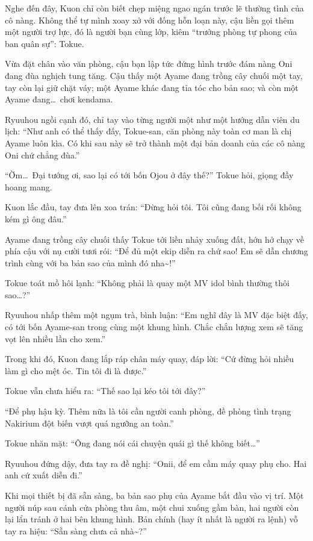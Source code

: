 \documentclass[../main.tex]{subfiles}
\begin{document}
Nghe đến đây, Kuon chỉ còn biết chẹp miệng ngao ngán trước lẽ thường tình của cô nàng. Không thể tự mình xoay xở với đống hỗn loạn này, cậu liền gọi thêm một người trợ lực, đó là người bạn cùng lớp, kiêm ``trưởng phòng tự phong của ban quân sự'': Tokue.

Vừa đặt chân vào văn phòng, cậu bạn lập tức đứng hình trước đám nàng Oni đang đùa nghịch tung tăng. Cậu thấy một Ayame đang trồng cây chuối một tay, tay còn lại giữ chặt váy; một Ayame khác đang tỉa tóc cho bản sao; và còn một Ayame đang\dots\ chơi kendama.

Ryuuhou ngồi cạnh đó, chỉ tay vào từng người một như một hướng dẫn viên du lịch: ``Như anh có thể thấy đấy, Tokue-san, căn phòng này toàn cơ man là chị Ayame luôn kìa. Có khi sau này sẽ trở thành một đại bản doanh của các cô nàng Oni chứ chẳng đùa.''

``Ờm\dots\ Đại tướng ơi, sao lại có tới bốn Ojou ở đây thế?'' Tokue hỏi, giọng đầy hoang mang.

Kuon lắc đầu, tay đưa lên xoa trán: ``Đừng hỏi tôi. Tôi cũng đang bối rối không kém gì ông đâu.''

Ayame đang trồng cây chuối thấy Tokue tới liền nhảy xuống đất, hớn hở chạy về phía cậu với nụ cười tươi rói: ``Để đủ một ekip diễn ra chứ sao! Em sẽ dẫn chương trình cùng với ba bản sao của mình đó nha\~{}!''

Tokue toát mồ hôi lạnh: ``Không phải là quay một MV idol bình thường thôi sao\dots?''

Ryuuhou nhấp thêm một ngụm trà, bình luận: ``Em nghĩ đây là MV đặc biệt đấy, có tới bốn Ayame-san trong cùng một khung hình. Chắc chắn lượng xem sẽ tăng vọt lên nhiều lần cho xem.''

Trong khi đó, Kuon đang lắp ráp chân máy quay, đáp lời: ``Cứ đừng hỏi nhiều làm gì cho mệt óc. Tin tôi đi là được.''

Tokue vẫn chưa hiểu ra: ``Thế sao lại kéo tôi tới đây?''

``Để phụ hậu kỳ. Thêm nữa là tôi cần người canh phòng, đề phòng tình trạng Nakirium đột biến vượt quá ngưỡng an toàn.''

Tokue nhăn mặt: ``Ông đang nói cái chuyện quái gì thế không biết\dots''

Ryuuhou đứng dậy, đưa tay ra đề nghị: ``Onii, để em cầm máy quay phụ cho. Hai anh cứ xuất diễn đi.''

Khi mọi thiết bị đã sẵn sàng, ba bản sao phụ của Ayame bắt đầu vào vị trí. Một người núp sau cánh cửa phòng thu âm, một chui xuống gầm bàn, hai người còn lại lẩn tránh ở hai bên khung hình. Bản chính (hay ít nhất là người ra lệnh) vỗ tay ra hiệu: ``Sẵn sàng chưa cả nhà\~{}?''
\end{document}
